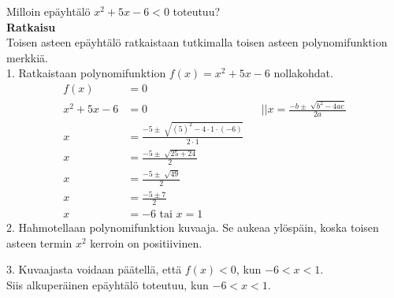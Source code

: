 \begin{esimerkki} 
Milloin epäyhtälö $x^2+5x-6<0$ toteutuu? \\ 
\textbf{Ratkaisu} \\
Toisen asteen epäyhtälö ratkaistaan tutkimalla toisen asteen polynomifunktion merkkiä.  \\
1. Ratkaistaan polynomifunktion $f(x)=x^2+5x-6$ nollakohdat.
\begin{align*}
f(x)&=0 \\
x^2+5x-6&=0 \ \  \ \ \ &&||x=\frac{-b \pm \sqrt[]{b^2-4ac}}{2a} \\ 
x&=\frac{-5 \pm \sqrt[]{(5)^2-4 \cdot 1 \cdot(-6)}}{2 \cdot 1} \\
x&=\frac{-5 \pm \sqrt[]{25+24}}{2} \\
x&=\frac{-5 \pm \sqrt[]{49}}{2} \\
x&=\frac{-5 \pm 7}{2} \\
x&=-6 \text{ tai } x=1
\end{align*}
2. Hahmotellaan polynomifunktion kuvaaja. Se aukeaa ylöspäin, koska toisen
asteen termin $x^2$ kerroin on positiivinen. \\ 

\begin{lukusuora}{-2.5}{2.5}{5}
\end{lukusuora}

3.  Kuvaajasta voidaan päätellä, että $f(x)<0$, kun $-6 < x < 1$.  \\
Siis alkuperäinen epäyhtälö toteutuu, kun $-6 < x <1$.  
\end{esimerkki}
